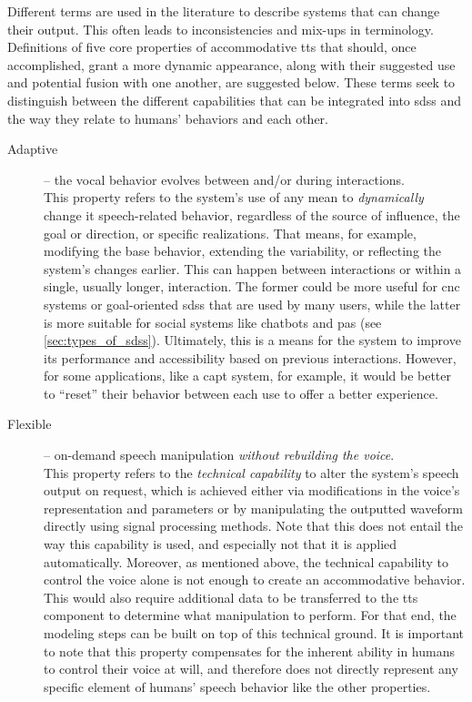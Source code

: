 Different terms are used in the literature to describe systems that can change their output.
This often leads to inconsistencies and mix-ups in terminology.
Definitions of five core properties of accommodative \ac{tts} that should, once accomplished, grant a more dynamic appearance, along with their suggested use and potential fusion with one another, are suggested below.
These terms seek to distinguish between the different capabilities that can be integrated into \acp{sds} and the way they relate to humans’ behaviors and each other.
%
\begin{description}
	\item[Adaptive] -- the vocal behavior evolves between and/or during interactions.\\
	This property refers to the system's use of any mean to \emph{dynamically} change it speech-related behavior, regardless of the source of influence, the goal or direction, or specific realizations.
	That means, for example, modifying the base behavior, extending the variability, or reflecting the system's changes earlier.
	This can happen between interactions or within a single, usually longer, interaction.
	The former could be more useful for \ac{cnc} systems or goal-oriented \acp{sds} that are used by many users, while the latter is more suitable for social systems like chatbots and \acp{pa} (see \cref{sec:types_of_sdss}).
	Ultimately, this is a means for the system to improve its performance and accessibility based on previous interactions.
	However, for some applications, like a \ac{capt} system, for example, it would be better to \enquote{reset} their behavior between each use to offer a better experience.

	\item[Flexible] -- on-demand speech manipulation \emph{without rebuilding the voice}.\\
	This property refers to the \emph{technical capability} to alter the system's speech output on request, which is achieved either via modifications in the voice's representation and parameters or by manipulating the outputted waveform directly using signal processing methods.
	Note that this does not entail the way this capability is used, and especially not that it is applied automatically.
	Moreover, as mentioned above, the technical capability to control the voice alone is not enough to create an accommodative behavior.
	This would also require additional data to be transferred to the \ac{tts} component to determine what manipulation to perform.
	For that end, the modeling steps can be built on top of this technical ground.
	It is important to note that this property compensates for the inherent ability in humans to control their voice at will, and therefore does not directly represent any specific element of humans' speech behavior like the other properties.
	

\end{description}
